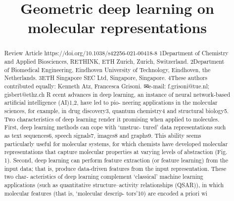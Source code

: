 \title{Geometric deep learning on molecular representations}

\maketitle

\begin{abstract}
Review Article https://doi.org/10.1038/s42256-021-00418-8 1Department of Chemistry and Applied Biosciences, RETHINK, ETH Zurich, Zurich, Switzerland. 2Department of Biomedical Engineering, Eindhoven University of Technology, Eindhoven, the Netherlands. 3ETH Singapore SEC Ltd, Singapore, Singapore. 4These authors contributed equally: Kenneth Atz, Francesca Grisoni. ✉e-mail: f.grisoni@tue.nl; gisbert@ethz.ch R ecent advances in deep learning, an instance of neural network-based artificial intelligence (AI)1,2, have led to pio- neering applications in the molecular sciences, for example, in drug discovery3, quantum chemistry4 and structural biology5. Two characteristics of deep learning render it promising when applied to molecules. First, deep learning methods can cope with ‘unstruc- tured’ data representations such as text sequences6, speech signals7, images8 and graphs9. This ability seems particularly useful for molecular systems, for which chemists have developed molecular representations that capture molecular properties at varying levels of abstraction (Fig. 1). Second, deep learning can perform feature extraction (or feature learning) from the input data; that is, produce data-driven features from the input representation. These two char- acteristics of deep learning complement ‘classical’ machine learning applications (such as quantitative structure–activity relationships (QSAR)), in which molecular features (that is, ‘molecular descrip- tors’10) are encoded a priori wi
\end{abstract}

